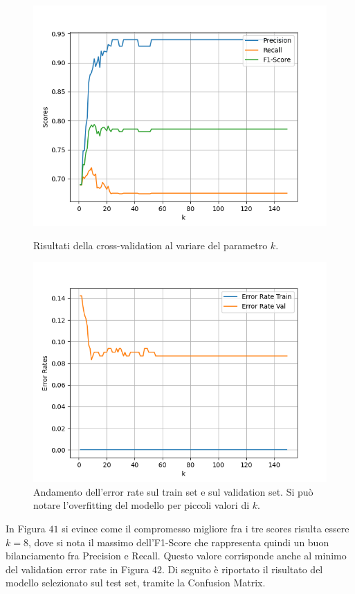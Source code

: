 \documentclass[a4paper,9pt]{article}
\begin{document}
\begin{figure}[H]
  \centering
  \begin{minipage}{.45\textwidth}
    \centering
    \includegraphics[width=\textwidth]{Gridsearch60distance.png}
    \caption{Risultati della cross-validation al variare del parametro $k$.}
  \end{minipage}
  \begin{minipage}{.45\textwidth}
    \centering
    \includegraphics[width=\textwidth]{Overfitting60distance.png}
    \caption{Andamento dell'error rate sul train set e sul validation set. Si può notare l'overfitting del modello per piccoli valori di $k$.}
  \end{minipage}
  \end{figure}
In Figura $41$ si evince come il compromesso migliore fra i tre scores risulta essere $k=8$, dove si nota il massimo dell'F1-Score che rappresenta quindi un buon bilanciamento fra Precision e Recall. Questo valore corrisponde anche al minimo del validation error rate in Figura $42$.
Di seguito è riportato il risultato del modello selezionato sul test set, tramite la Confusion Matrix.\\
\end{document}
